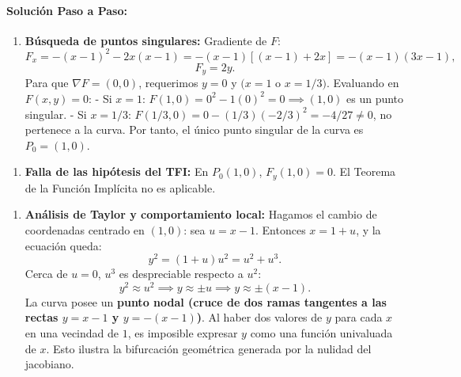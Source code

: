 \documentclass[11pt,a4paper]{article}
\begin{document}
\paragraph{Solución Paso a Paso:}\par
\begin{enumerate}[label=\textbf{\arabic*.}]
\item \textbf{Búsqueda de puntos singulares:}
Gradiente de $F$:
\begin{equation*}
F_x = -(x - 1)^2 - 2x(x - 1) = -(x - 1)[(x - 1) + 2x] = -(x - 1)(3x - 1),
\end{equation*}
\begin{equation*}
F_y = 2y.
\end{equation*}
Para que $\nabla F = (0,0)$, requerimos $y = 0$ y $(x=1$ o $x=1/3)$.
Evaluando en $F(x,y) = 0$:
- Si $x=1$: $F(1,0) = 0^2 - 1(0)^2 = 0 \implies (1,0)$ es un punto singular.
- Si $x=1/3$: $F(1/3, 0) = 0 - (1/3)(-2/3)^2 = -4/27 \neq 0$, no pertenece a la curva.
Por tanto, el único punto singular de la curva es $P_0 = (1,0)$.
\end{enumerate}

\begin{enumerate}[label=\textbf{\arabic*.}]
\item \textbf{Falla de las hipótesis del TFI:}
En $P_0(1,0)$, $F_y(1,0) = 0$. El Teorema de la Función Implícita no es aplicable.
\end{enumerate}

\begin{enumerate}[label=\textbf{\arabic*.}]
\item \textbf{Análisis de Taylor y comportamiento local:}
Hagamos el cambio de coordenadas centrado en $(1,0)$: sea $u = x - 1$.
Entonces $x = 1 + u$, y la ecuación queda:
\begin{equation*}
y^2 = (1 + u) u^2 = u^2 + u^3.
\end{equation*}
Cerca de $u = 0$, $u^3$ es despreciable respecto a $u^2$:
\begin{equation*}
y^2 \approx u^2 \implies y \approx \pm u \implies y \approx \pm (x - 1).
\end{equation*}
La curva posee un \textbf{punto nodal (cruce de dos ramas tangentes a las rectas $y = x - 1$ y $y = -(x - 1)$)}.
Al haber dos valores de $y$ para cada $x$ en una vecindad de $1$, es imposible expresar $y$ como una función univaluada de $x$. Esto ilustra la bifurcación geométrica generada por la nulidad del jacobiano.
\end{enumerate}
\end{document}
